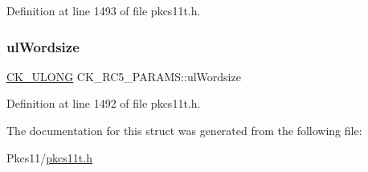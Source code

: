 Definition at line 1493 of file pkcs11t.\+h.

\mbox{\label{struct_c_k___r_c5___p_a_r_a_m_s_a3cd08884d3889efe696eeccbc2516aa5}} 
\subsubsection{\texorpdfstring{ul\+Wordsize}{ulWordsize}}
{\footnotesize\ttfamily \hyperlink{pkcs11t_8h_a35181858a3b7a0a81f49d180d8f446ef}{C\+K\+\_\+\+U\+L\+O\+NG} C\+K\+\_\+\+R\+C5\+\_\+\+P\+A\+R\+A\+M\+S\+::ul\+Wordsize}



Definition at line 1492 of file pkcs11t.\+h.



The documentation for this struct was generated from the following file\+:\begin{DoxyCompactItemize}
\item 
Pkcs11/\hyperlink{pkcs11t_8h}{pkcs11t.\+h}\end{DoxyCompactItemize}
